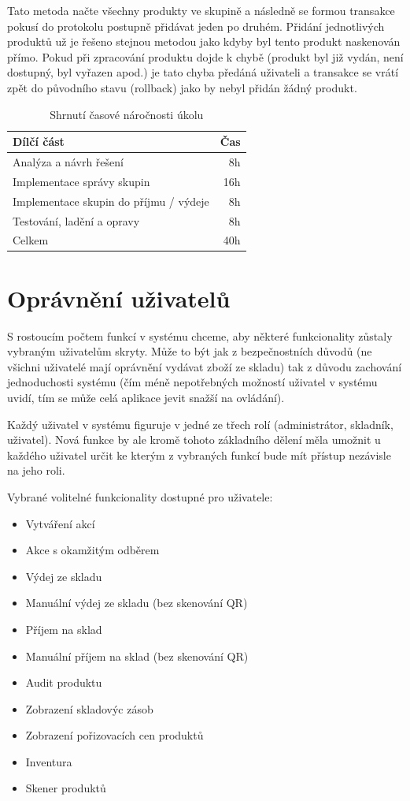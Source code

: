 Tato metoda načte všechny produkty ve skupině a následně se formou transakce pokusí do protokolu postupně přidávat jeden po druhém. Přidání jednotlivých produktů už je řešeno stejnou metodou jako kdyby byl tento produkt naskenován přímo. Pokud při zpracování produktu dojde k chybě (produkt byl již vydán, není dostupný, byl vyřazen apod.) je tato chyba předáná uživateli a transakce se vrátí zpět do původního stavu (rollback) jako by nebyl přidán žádný produkt. 


\begin{table}
	\centering
	\caption[Časová náročnost úkolu na skupiny produktů]{Shrnutí časové náročnosti úkolu}
	\label{tab:TopLevelTableLabel}
	{
		\begin{tabular}{lr}
			\toprule
			Dílčí část & Čas\\
			\midrule
			Analýza a návrh řešení & 8h \\
			Implementace správy skupin & 16h \\
            Implementace skupin do příjmu / výdeje & 8h \\
            Testování, ladění a opravy & 8h \\
            \midrule
            Celkem  & 40h \\
			\midrule
		\end{tabular}
	}
\end{table}

\section{Oprávnění uživatelů}

S rostoucím počtem funkcí v systému chceme, aby některé funkcionality zůstaly vybraným uživatelům skryty. Může to být jak z bezpečnostních důvodů (ne všichni uživatelé mají oprávnění vydávat zboží ze skladu) tak z důvodu zachování jednoduchosti systému (čím méně nepotřebných možností uživatel v systému uvidí, tím se může celá aplikace jevit snažší na ovládání).

Každý uživatel v systému figuruje v jedné ze třech rolí (administrátor, skladník, uživatel). Nová funkce by ale kromě tohoto základního dělení měla umožnit u každého uživatel určit ke kterým z vybraných funkcí bude mít přístup nezávisle na jeho roli.

Vybrané volitelné funkcionality dostupné pro uživatele:
\begin{itemize}
    \item Vytváření akcí
    \item Akce s okamžitým odběrem
    \item Výdej ze skladu
    \item Manuální výdej ze skladu (bez skenování QR)
    \item Příjem na sklad
    \item Manuální příjem na sklad (bez skenování QR)
    \item Audit produktu
    \item Zobrazení skladovýc zásob
    \item Zobrazení pořizovacích cen produktů
    \item Inventura
    \item Skener produktů
\end{itemize}

